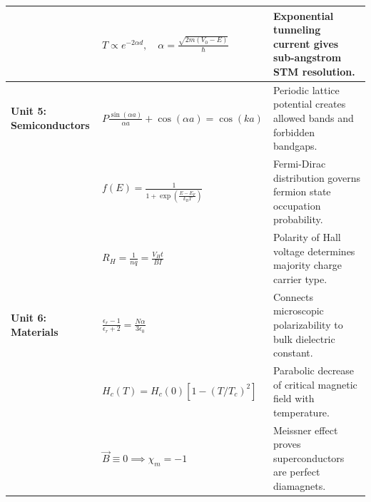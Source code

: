 \begin{center}
\begin{tabularx}{\textwidth}{l X X}
& $T \propto e^{-2\alpha d}, \quad \alpha = \frac{\sqrt{2m(V_0-E)}}{\hbar}$ & Exponential tunneling current gives sub-angstrom STM resolution. \\
\midrule
\textbf{Unit 5: Semiconductors} & $P\frac{\sin(\alpha a)}{\alpha a} + \cos(\alpha a) = \cos(ka)$ & Periodic lattice potential creates allowed bands and forbidden bandgaps. \\
& $f(E) = \frac{1}{1 + \exp\left(\frac{E-E_F}{k_B T}\right)}$ & Fermi-Dirac distribution governs fermion state occupation probability. \\
& $R_H = \frac{1}{n q} = \frac{V_H t}{B I}$ & Polarity of Hall voltage determines majority charge carrier type. \\
\midrule
\textbf{Unit 6: Materials} & $\frac{\epsilon_r - 1}{\epsilon_r + 2} = \frac{N\alpha}{3\epsilon_0}$ & Connects microscopic polarizability to bulk dielectric constant. \\
& $H_c(T) = H_c(0)[1 - (T/T_c)^2]$ & Parabolic decrease of critical magnetic field with temperature. \\
& $\vec{B} \equiv 0 \implies \chi_m = -1$ & Meissner effect proves superconductors are perfect diamagnets. \\
\bottomrule
\end{tabularx}
\end{center}
